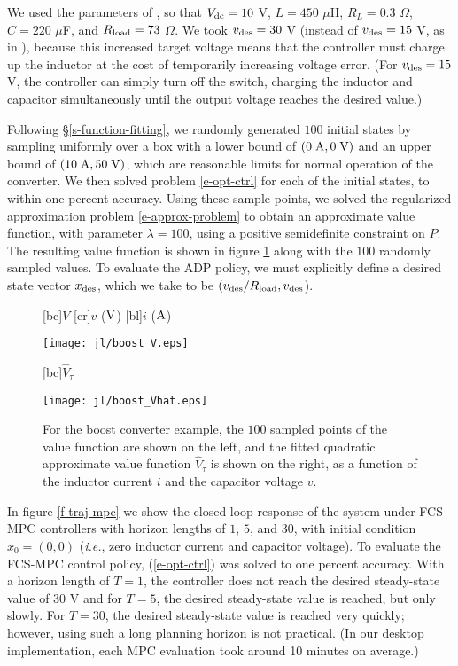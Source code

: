 \documentclass[12pt]{article}
\newcommand{\ie}{{\it i.e.}}
\newif\ifarxiv
\begin{document}
We used the parameters of \cite{karamanakos2013direct},
so that
$V_{\rm dc} = 10$ V,
$L = 450$ $\mu$H,
$R_L = 0.3$ $\Omega$,
$C = 220$ $\mu$F,
and
$R_{\rm load} = 73$ $\Omega$.
We took $v_{\rm des} = 30$ V
(instead of $v_{\rm des} = 15$ V, as in \cite{karamanakos2013direct}),
because this increased target voltage means that the controller must
charge up the inductor at the cost of temporarily increasing voltage error.
(For $v_{\rm des} = 15$ V,
the controller can simply turn off the switch,
charging the inductor and capacitor simultaneously
until the output voltage reaches the desired value.)

Following \S\ref{s-function-fitting},
we randomly generated $100$ initial states
by sampling uniformly over a box with
a lower bound of $(0\; \rm{A}, 0\; \rm{V})$
and an upper bound of $(10\; \rm{A}, 50\; \rm{V})$,
which are reasonable limits for normal operation of the converter.
We then solved problem \eqref{e-opt-ctrl} for each of the initial states,
to within one percent accuracy.
Using these sample points,
we solved the regularized approximation problem 
\eqref{e-approx-problem}
to obtain an approximate value function,
with parameter $\lambda = 100$, using a positive semidefinite constraint on $P$.
The resulting value function is shown in figure \ref{f-V}
along with the $100$ randomly sampled values.
To evaluate the ADP policy, we must explicitly define a desired state vector $x_{\rm des}$,
which we take to be $(v_{\rm des} / R_{\rm load}, v_{\rm des}$).


\begin{figure}
\centering
{}[bc]{\small $V$}
[cr]{\small $v$ ($\rm V$)}
[bl]{\small $i$ ($\rm A$)}
\ifarxiv
\texttt{[image: boost\_V.eps]}
\else
\texttt{[image: jl/boost\_V.eps]}
\fi
\qquad\qquad
{}[bc]{\small $\hat V_\tau$}
\ifarxiv
\texttt{[image: boost\_Vhat.eps]}
\else
\texttt{[image: jl/boost\_Vhat.eps]}
\fi
\caption{
For the boost converter example,
the $100$ sampled points of the value function are shown on the left,
and the fitted quadratic approximate value function $\hat V_\tau$
is shown on the right,
as a function of the inductor current $i$
and the capacitor voltage $v$.
}
\label{f-V}
\end{figure}

In figure \ref{f-traj-mpc} we show the closed-loop response of the system
under FCS-MPC controllers with horizon lengths of $1$, $5$, and $30$,
with initial condition $x_0 = (0, 0)$ 
(\ie, zero inductor current and capacitor voltage).
To evaluate the FCS-MPC control policy,
(\ref{e-opt-ctrl}) was solved to one percent accuracy.
With a horizon length of $T = 1$,
the controller does not reach the desired steady-state
value of $30$ V
and for $T=5$, the desired steady-state value is reached,
but only slowly.
For $T =30$, the desired steady-state value is reached very quickly;
however, using such a long planning horizon is not practical.
(In our desktop implementation, 
each MPC evaluation took around 10 minutes on average.)
\end{document}

